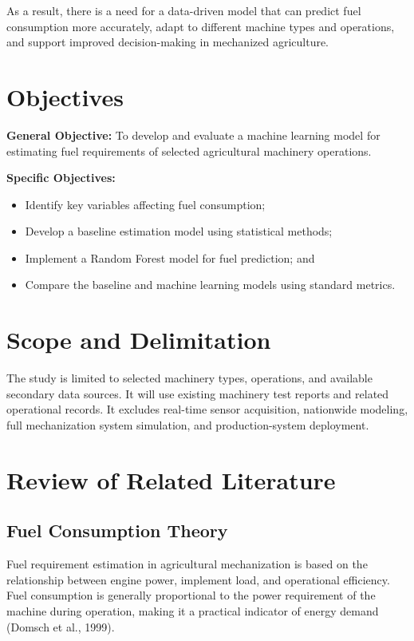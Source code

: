 \documentclass[11pt,twocolumn]{article}
\begin{document}
\vspace{10pt}

As a result, there is a need for a data-driven model that can predict fuel consumption more accurately, adapt to different machine types and operations, and support improved decision-making in mechanized agriculture.

\section*{Objectives}

\textbf{General Objective:} To develop and evaluate a machine learning model for estimating fuel requirements of selected agricultural machinery operations.

\vspace{10pt}

\textbf{Specific Objectives:}
\begin{itemize}
\item Identify key variables affecting fuel consumption;
\item Develop a baseline estimation model using statistical methods;
\item Implement a Random Forest model for fuel prediction; and
\item Compare the baseline and machine learning models using standard metrics.
\end{itemize}

\section*{Scope and Delimitation}

The study is limited to selected machinery types, operations, and available secondary data sources. It will use existing machinery test reports and related operational records. It excludes real-time sensor acquisition, nationwide modeling, full mechanization system simulation, and production-system deployment.

\section*{Review of Related Literature}

\subsection*{Fuel Consumption Theory}

Fuel requirement estimation in agricultural mechanization is based on the relationship between engine power, implement load, and operational efficiency. Fuel consumption is generally proportional to the power requirement of the machine during operation, making it a practical indicator of energy demand (Domsch et al., 1999).
\end{document}
